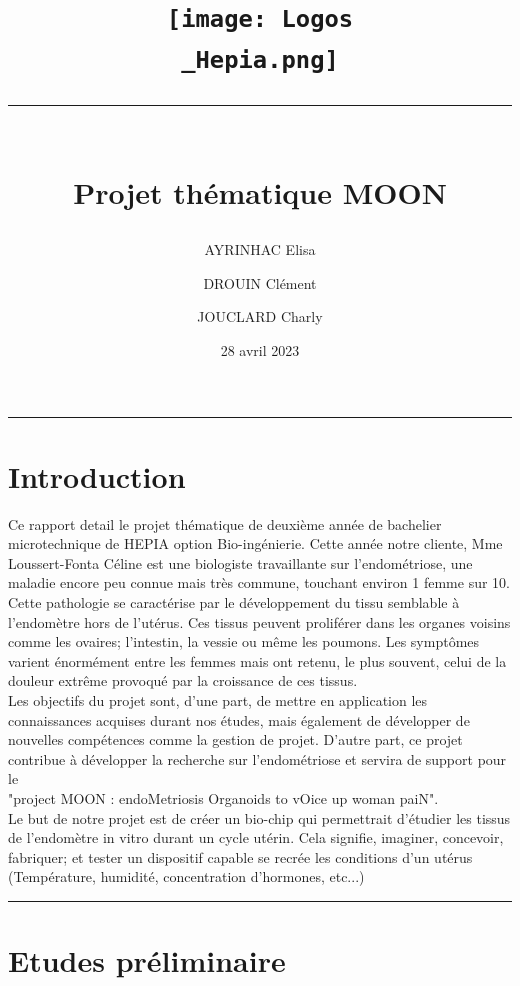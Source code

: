 \documentclass[a4paper, 11pt]{article}
\title{
    \vspace{-2.5cm}
    \centering\texttt{[image: Logos\\\_Hepia.png]}\\
    \centering\rule{17cm}{0.1mm}\vspace*{0.4in}\\
    \centering Projet thématique MOON}
\author[1]{AYRINHAC Elisa}
\author[2]{DROUIN Clément}
\author[3]{JOUCLARD Charly}
\affil[1]{HEPIA, MT2, elisa.ayrinhac@hes-so.ch}
\affil[2]{HEPIA, MT2, clement.drouin@hes-so.ch}
\affil[3]{HEPIA, MT2, charly.jouclard@hes-so.ch}
\date{28 avril 2023}
\begin{document}
\maketitle
\thispagestyle{empty}
\begin{center}
    \rule{\textwidth}{0.1mm}
\end{center}
\vspace{-1cm}
\section*{Introduction}
Ce rapport detail le projet thématique de deuxième année de bachelier 
microtechnique de HEPIA option Bio-ingénierie.
Cette année notre cliente, Mme Loussert-Fonta Céline est une biologiste travaillante 
sur l'endométriose, une maladie encore 
peu connue mais très commune, touchant environ 1 femme sur 10.\\
Cette pathologie se caractérise par le développement du tissu semblable 
à l'endomètre hors de l'utérus.
Ces tissus peuvent proliférer dans les organes voisins comme les ovaires; 
l'intestin, la vessie ou même les poumons.
Les symptômes varient énormément entre les femmes mais ont retenu, le 
plus souvent, celui de la douleur 
extrême provoqué par la croissance de ces tissus.\\
Les objectifs du projet sont, d'une part, de mettre en application les 
connaissances acquises durant nos études, mais également de développer de 
nouvelles compétences comme la gestion de projet.
D'autre part, ce projet contribue à développer la recherche sur 
l'endométriose et servira de support pour le \\
"project MOON : endoMetriosis Organoids to vOice up woman paiN".\\
Le but de notre projet est de créer un bio-chip qui permettrait d'étudier 
les tissus de l'endomètre in vitro durant un cycle utérin. Cela signifie, imaginer, concevoir, fabriquer; 
et tester un dispositif capable se recrée 
les conditions d'un utérus (Température, humidité, concentration d'hormones, etc...)
\vspace{1cm}
\maketitle
\thispagestyle{empty}
\begin{center}
    \rule{\textwidth}{0.1mm}
\end{center}
\newpage
\tableofcontents
\newpage
\section{Etudes préliminaire}
\end{document}
